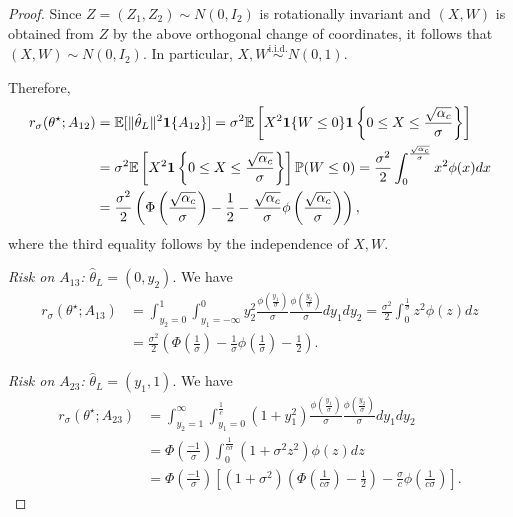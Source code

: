 \documentclass[11pt]{article}
\theoremstyle{plain}
\theoremstyle{definition}
\newcommand{\indicator}{{\bf{1}}}
\newcommand{\E}{\mathbb{E}}
\renewcommand{\P}{\mathbb{P}}
\newcommand{\hattheta}{\hat{\theta}}
\newcommand{\inparen}[1]{\left(#1\right)}             %
\newcommand{\inbraces}[1]{\left\{#1\right\}}           %
\newcommand{\insquare}[1]{\left[#1\right]}             %
\begin{document}
\begin{proof}
Since $Z=(Z_1,Z_2)\sim N(0,I_2)$ is rotationally invariant and $(X,W)$ is obtained from $Z$ by the above orthogonal change of coordinates, it follows that $(X,W)\sim N(0,I_2)$. 
In particular, $X,W\overset{\mathrm{i.i.d.}}{\sim}N(0,1)$.

Therefore, 
\begin{align*}
    r_\sigma(\theta^\star; A_{12})
    &= \E[\| \hattheta_L \|^2 \indicator \{A_{12}\}]= \sigma^2 \E \insquare{ X^2 \indicator \{ W \le 0\} \indicator \inbraces{ 0 \le X \le  \frac{\sqrt{\alpha_c}}{\sigma} } }\\
    &= \sigma^2 \E \insquare{ X^2 \indicator \inbraces{ 0 \le X \le  \frac{\sqrt{\alpha_c}}{\sigma} }} \P(W \le 0)
    = \frac{\sigma^2}{2} \int_0^{\frac{\sqrt{\alpha_c}}{\sigma}} x^2 \phi(x)dx \\
    &= \frac{\sigma^2}{2} \inparen{\Phi\inparen{\frac{\sqrt{\alpha_c}}{\sigma}}-\frac{1}{2} - \frac{\sqrt{\alpha_c}}{\sigma} \phi\inparen{\frac{\sqrt{\alpha_c}}{\sigma}}},
\end{align*}
where the third equality follows by the independence of $X,W$.

\noindent
\textit{Risk on $A_{13}$:} $\hattheta_L = (0,y_2)$. We have 
\begin{align*}
    r_\sigma(\theta^\star; A_{13})
    &=
    \int_{y_2=0}^1 \int_{y_1=-\infty}^0 y_2^2 \frac{\phi\inparen{\frac{y_1}{\sigma}}}{\sigma} \frac{\phi\inparen{\frac{y_2}{\sigma}}}{\sigma} dy_1 dy_2
    = \frac{\sigma^2}{2} \int_{0}^{\frac{1}{\sigma}} z^2 \phi(z)dz \\
    &= \frac{\sigma^2}{2} \inparen{ \Phi \inparen{\frac{1}{\sigma}} - \frac{1}{\sigma} \phi \inparen{\frac{1}{\sigma}}-\frac{1}{2}}.
\end{align*}

\noindent
\textit{Risk on $A_{23}$:} $\hattheta_L = (y_1,1)$. We have 
\begin{align*}
    r_\sigma(\theta^\star; A_{23})
    &=
    \int_{y_2=1}^\infty \int_{y_1=0}^{\frac{1}{c}} (1+y_1^2)\frac{\phi\inparen{\frac{y_1}{\sigma}}}{\sigma} \frac{\phi\inparen{\frac{y_2}{\sigma}}}{\sigma} dy_1 dy_2
    \\
    &= 
    \Phi \inparen{\frac{-1}{\sigma}} \int_0^{\frac{1}{c\sigma}} (1+\sigma^2 z^2) \phi(z) dz\\
    &= 
    \Phi \inparen{\frac{-1}{\sigma}} \insquare{
    (1+\sigma^2)\inparen{ \Phi\inparen{\frac{1}{c\sigma}} - \frac{1}{2}} - \frac{\sigma}{c} \phi\inparen{\frac{1}{c\sigma}}
    }.
\end{align*}

\end{proof}
\end{document}
